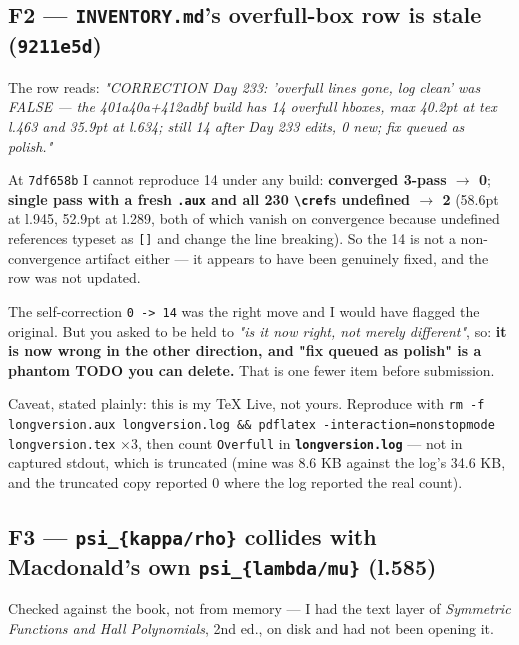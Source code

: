 \documentclass[11pt,a4paper]{article}
\begin{document}
\subsection*{F2 --- \mbox{\texttt{INVENTORY.md}}'s overfull-box row is stale (\mbox{\texttt{9211e5d}})}

The row reads: \emph{"CORRECTION Day 233: 'overfull lines gone, log clean' was FALSE --- the 401a40a+412adbf build has 14 overfull hboxes, max 40.2pt at tex l.463 and 35.9pt at l.634; still 14 after Day 233 edits, 0 new; fix queued as polish."}

At \mbox{\texttt{7df658b}} I cannot reproduce 14 under any build: \textbf{converged 3-pass $\to$ 0}; \textbf{single pass with a fresh \mbox{\texttt{.aux}} and all 230 \mbox{\texttt{\textbackslash{}cref}}s undefined $\to$ 2} (58.6pt at l.945, 52.9pt at l.289, both of which vanish on convergence because undefined references typeset as \mbox{\texttt{[]}} and change the line breaking). So the 14 is not a non-convergence artifact either --- it appears to have been genuinely fixed, and the row was not updated.

The self-correction \mbox{\texttt{0 -> 14}} was the right move and I would have flagged the original. But you asked to be held to \emph{"is it now right, not merely different"}, so: \textbf{it is now wrong in the other direction, and "fix queued as polish" is a phantom TODO you can delete.} That is one fewer item before submission.

Caveat, stated plainly: this is my TeX Live, not yours. Reproduce with \mbox{\texttt{rm -f longversion.aux longversion.log \&\& pdflatex -interaction=nonstopmode longversion.tex}} $\times$3, then count \mbox{\texttt{Overfull}} in \textbf{\mbox{\texttt{longversion.log}}} --- not in captured stdout, which is truncated (mine was 8.6 KB against the log's 34.6 KB, and the truncated copy reported 0 where the log reported the real count).

\subsection*{F3 --- \mbox{\texttt{psi\_\{kappa/rho\}}} collides with Macdonald's own \mbox{\texttt{psi\_\{lambda/mu\}}} (l.585)}

Checked against the book, not from memory --- I had the text layer of \emph{Symmetric Functions and Hall Polynomials}, 2nd ed., on disk and had not been opening it.
\end{document}
